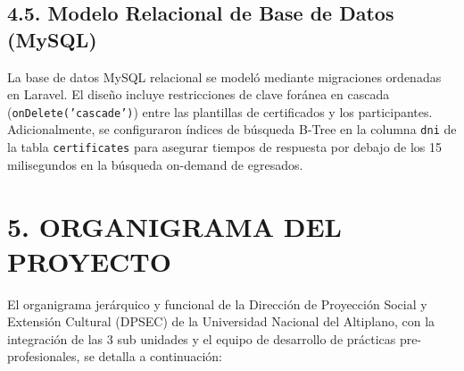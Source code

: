 \documentclass[11pt,a4paper]{article}
\begin{document}
\subsection*{4.5. Modelo Relacional de Base de Datos (MySQL)}
La base de datos MySQL relacional se modeló mediante migraciones ordenadas en Laravel. El diseño incluye restricciones de clave foránea en cascada (\texttt{onDelete('cascade')}) entre las plantillas de certificados y los participantes. Adicionalmente, se configuraron índices de búsqueda B-Tree en la columna \texttt{dni} de la tabla \texttt{certificates} para asegurar tiempos de respuesta por debajo de los 15 milisegundos en la búsqueda on-demand de egresados.

\newpage

\section*{5. ORGANIGRAMA DEL PROYECTO}
El organigrama jerárquico y funcional de la Dirección de Proyección Social y Extensión Cultural (DPSEC) de la Universidad Nacional del Altiplano, con la integración de las 3 sub unidades y el equipo de desarrollo de prácticas pre-profesionales, se detalla a continuación:
\end{document}

